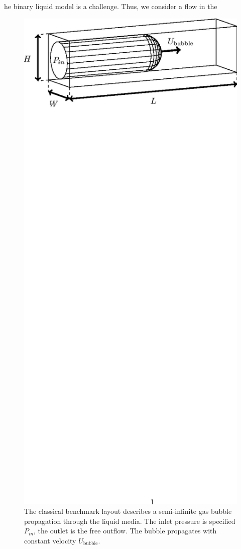 \documentclass[preprint,12pt]{elsarticle}
\begin{document}
he binary liquid model is a challenge. Thus, we consider a flow in the
\begin{figure}[htb!]
\includegraphics*[bb=153 610 410 717,width=\textwidth]{Figures/benchmark_classical.eps} 
\caption{The classical benchmark layout describes a semi-infinite gas bubble
propagation through the liquid media. The inlet pressure is specified $P_{in}$, the outlet is the
free outflow. The bubble propagates with constant velocity $U_{\mathrm{bubble}}$. 
\label{fig:classical:benchmark}}
\end{figure}
\end{document}
